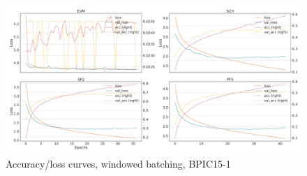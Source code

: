 \begin{figure}[!htb]
    \centering
    \includegraphics[width=\textwidth]{gfx/bpic2015_1/windowed_loss_acc_curve.pdf}
    \caption{Accuracy/loss curves, windowed batching, BPIC15-1}
\end{figure}
\FloatBarrier

